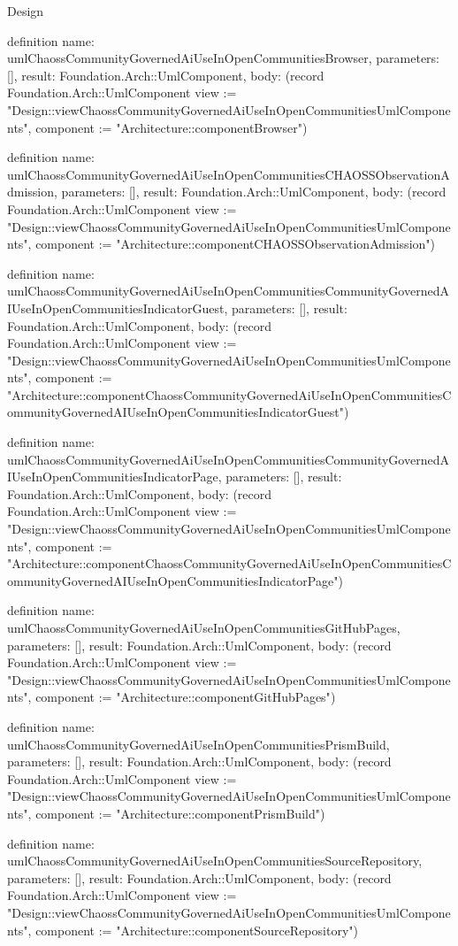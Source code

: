 \begin{lexlean}{Design}
\begin{semanticmodule}
definition{
  name: umlChaossCommunityGovernedAiUseInOpenCommunitiesBrowser,
  parameters: [],
  result: Foundation.Arch::UmlComponent,
  body: (record Foundation.Arch::UmlComponent {view := "Design::viewChaossCommunityGovernedAiUseInOpenCommunitiesUmlComponents", component := "Architecture::componentBrowser"})
}

definition{
  name: umlChaossCommunityGovernedAiUseInOpenCommunitiesCHAOSSObservationAdmission,
  parameters: [],
  result: Foundation.Arch::UmlComponent,
  body: (record Foundation.Arch::UmlComponent {view := "Design::viewChaossCommunityGovernedAiUseInOpenCommunitiesUmlComponents", component := "Architecture::componentCHAOSSObservationAdmission"})
}

definition{
  name: umlChaossCommunityGovernedAiUseInOpenCommunitiesCommunityGovernedAIUseInOpenCommunitiesIndicatorGuest,
  parameters: [],
  result: Foundation.Arch::UmlComponent,
  body: (record Foundation.Arch::UmlComponent {view := "Design::viewChaossCommunityGovernedAiUseInOpenCommunitiesUmlComponents", component := "Architecture::componentChaossCommunityGovernedAiUseInOpenCommunitiesCommunityGovernedAIUseInOpenCommunitiesIndicatorGuest"})
}

definition{
  name: umlChaossCommunityGovernedAiUseInOpenCommunitiesCommunityGovernedAIUseInOpenCommunitiesIndicatorPage,
  parameters: [],
  result: Foundation.Arch::UmlComponent,
  body: (record Foundation.Arch::UmlComponent {view := "Design::viewChaossCommunityGovernedAiUseInOpenCommunitiesUmlComponents", component := "Architecture::componentChaossCommunityGovernedAiUseInOpenCommunitiesCommunityGovernedAIUseInOpenCommunitiesIndicatorPage"})
}

definition{
  name: umlChaossCommunityGovernedAiUseInOpenCommunitiesGitHubPages,
  parameters: [],
  result: Foundation.Arch::UmlComponent,
  body: (record Foundation.Arch::UmlComponent {view := "Design::viewChaossCommunityGovernedAiUseInOpenCommunitiesUmlComponents", component := "Architecture::componentGitHubPages"})
}

definition{
  name: umlChaossCommunityGovernedAiUseInOpenCommunitiesPrismBuild,
  parameters: [],
  result: Foundation.Arch::UmlComponent,
  body: (record Foundation.Arch::UmlComponent {view := "Design::viewChaossCommunityGovernedAiUseInOpenCommunitiesUmlComponents", component := "Architecture::componentPrismBuild"})
}

definition{
  name: umlChaossCommunityGovernedAiUseInOpenCommunitiesSourceRepository,
  parameters: [],
  result: Foundation.Arch::UmlComponent,
  body: (record Foundation.Arch::UmlComponent {view := "Design::viewChaossCommunityGovernedAiUseInOpenCommunitiesUmlComponents", component := "Architecture::componentSourceRepository"})
}


\end{semanticmodule}
\end{lexlean}
